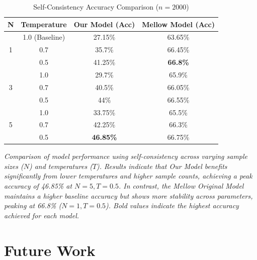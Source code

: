 \documentclass[cameraready]{Interspeech}
\begin{document}
\begin{table}[h!]
    \centering
    \caption{Self-Consistency Accuracy Comparison ($n=2000$)}
    \label{tab:sc_results}
    \begin{threeparttable}
    \setlength{\tabcolsep}{3pt}
    \begin{tabular}{@{}cccc@{}}
        \toprule
        \textbf{N} & \textbf{Temperature} & \textbf{Our Model (Acc)} & \textbf{Mellow Model (Acc)} \\ \midrule
        \multirow{3}{*}{1} & 1.0 (Baseline) & 27.15\% & 63.65\% \\
                           & 0.7            & 35.7\%  & 66.45\% \\
                           & 0.5            & 41.25\% & \textbf{66.8\%} \\ \midrule
        \multirow{3}{*}{3} & 1.0            & 29.7\%  & 65.9\% \\
                           & 0.7            & 40.5\%  & 66.05\% \\
                           & 0.5            & 44\%    & 66.55\% \\ \midrule
        \multirow{3}{*}{5} & 1.0            & 33.75\% & 65.5\% \\
                           & 0.7            & 42.25\% & 66.3\% \\
                           & 0.5            & \textbf{46.85\%}
                           & 66.75\% \\ \bottomrule
    \end{tabular}
    \begin{tablenotes}
      \small
      \item \textit{Comparison of model performance using self-consistency across varying sample sizes ($N$) and temperatures ($T$). Results indicate that Our Model benefits significantly from lower temperatures and higher sample counts, achieving a peak accuracy of 46.85\% at $N=5, T=0.5$. In contrast, the Mellow Original Model maintains a higher baseline accuracy but shows more stability across parameters, peaking at 66.8\% ($N=1, T=0.5$). Bold values indicate the highest accuracy achieved for each model.}
    \end{tablenotes}
    \end{threeparttable}
\end{table}
\section{Future Work}
\label{sec:future}
\end{document}
